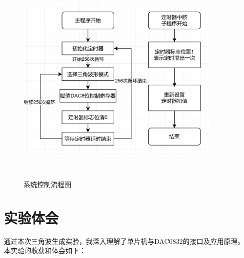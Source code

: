 \documentclass[12pt,hyperref,a4paper,UTF8]{ctexart}
\begin{document}
\begin{figure}[H] %
        \centering
        \includegraphics[width=0.9\textwidth]{figures/301.png} %
        \caption{系统控制流程图} %
        \label{fig:example} %
\end{figure}



\section{实验体会}

通过本次三角波生成实验，我深入理解了单片机与DAC0832的接口及应用原理。本实验的收获和体会如下：
\end{document}
